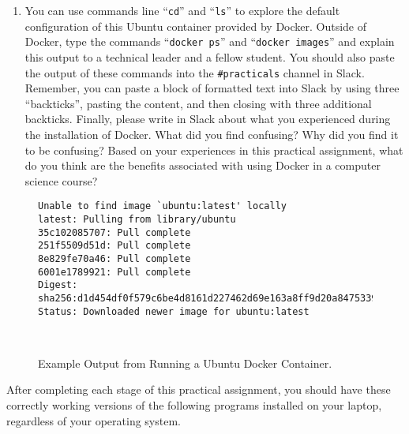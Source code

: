 \documentclass[11pt]{article}
\newcommand{\command}[1]{``\lstinline{#1}''}
\newcommand{\url}[1]{\lstinline{#1}}
\begin{document}
\begin{enumerate}
  \item You can use commands line \command{cd} and \command{ls} to explore the
    default configuration of this Ubuntu container provided by Docker. Outside
    of Docker, type the commands \command{docker ps} and \command{docker images}
    and explain this output to a technical leader and a fellow student. You
    should also paste the output of these commands into the \url{#practicals}
    channel in Slack. Remember, you can paste a block of formatted text into
    Slack by using three ``backticks'', pasting the content, and then closing
    with three additional backticks. Finally, please write in Slack about what
    you experienced during the installation of Docker. What did you find
    confusing? Why did you find it to be confusing? Based on your experiences in
    this practical assignment, what do you think are the benefits associated
    with using Docker in a computer science course?

\end{enumerate}


\begin{figure}

\begin{verbatim}
Unable to find image `ubuntu:latest' locally
latest: Pulling from library/ubuntu
35c102085707: Pull complete
251f5509d51d: Pull complete
8e829fe70a46: Pull complete
6001e1789921: Pull complete
Digest: sha256:d1d454df0f579c6be4d8161d227462d69e163a8ff9d20a847533989cf0c94d90
Status: Downloaded newer image for ubuntu:latest
\end{verbatim}

\vspace*{-.25in}
\caption{Example Output from Running a Ubuntu Docker Container.}~\label{fig:ubuntu}
\vspace*{-.25in}
\end{figure}

\vspace*{-.1in}

After completing each stage of this practical assignment, you should have these
correctly working versions of the following programs installed on your laptop,
regardless of your operating system.

\vspace*{-.05in}
\end{document}
